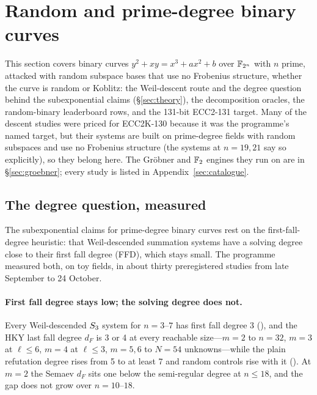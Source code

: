 \section{Random and prime-degree binary curves}\label{sec:binary}

This section covers binary curves $y^2+xy=x^3+ax^2+b$ over $\mathbb{F}_{2^n}$
with $n$ prime, attacked with random subspace bases that use no Frobenius
structure, whether the curve is random or Koblitz: the Weil-descent route and the
degree question behind the subexponential claims
(\S\ref{sec:theory}), the decomposition oracles, the random-binary
leaderboard rows, and the 131-bit ECC2-131 target. Many of the descent
studies were priced for ECC2K-130 because it was the programme's named
target, but their systems are built on prime-degree fields with random
subspaces and use no Frobenius structure (the systems at $n=19,21$ say so
explicitly), so they belong here. The Gröbner and $\mathbb{F}_2$ engines they run
on are in \S\ref{sec:groebner}; every study is listed in
Appendix~\ref{sec:catalogue}.

\subsection{The degree question, measured}\label{sec:binary-descent}

The subexponential claims for prime-degree binary curves rest on the
first-fall-degree heuristic: that Weil-descended summation systems have a
solving degree close to their first fall degree (FFD), which stays small.
The programme measured both, on toy fields, in about thirty preregistered
studies from late September to 24 October.

\paragraph{First fall degree stays low; the solving degree does not.} Every
Weil-descended $S_{3}$ system for $n=3$--$7$ has first fall degree 3
(), and the
HKY last fall degree $d_F$ is 3 or 4 at every reachable size---$m=2$ to
$n=32$, $m=3$ at $\ell\le6$, $m=4$ at $\ell\le3$, $m=5,6$ to $N=54$
unknowns---while the plain refutation degree rises from 5 to at least 7
and random controls rise with it ().
At $m=2$ the Semaev $d_F$ sits one below the semi-regular degree at
$n\le18$, and the gap does not grow over $n=10$--$18$.

